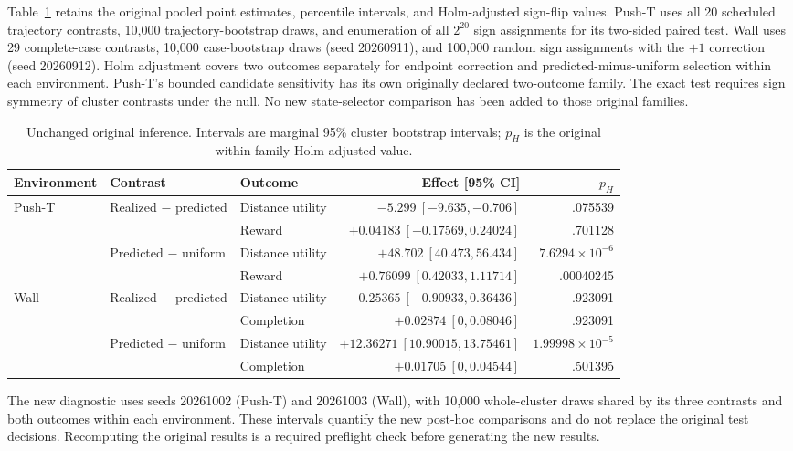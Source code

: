 Table~\ref{tab:original} retains the original pooled point estimates, percentile
intervals, and Holm-adjusted sign-flip values. Push-T uses all 20 scheduled
trajectory contrasts, 10,000 trajectory-bootstrap draws, and enumeration of
all $2^{20}$ sign assignments for its two-sided paired test. Wall uses 29
complete-case contrasts, 10,000 case-bootstrap draws (seed 20260911), and
100,000 random sign assignments with the $+1$ correction (seed 20260912).
Holm adjustment covers two outcomes separately for endpoint correction and
predicted-minus-uniform selection within each environment. Push-T's bounded
candidate sensitivity has its own originally declared two-outcome family.
The exact test requires sign symmetry of cluster contrasts under the null.
No new state-selector comparison has been added to those original families.

\begin{table}[h]
\caption{Unchanged original inference. Intervals are marginal 95\% cluster
bootstrap intervals; $p_H$ is the original within-family Holm-adjusted value.}
\label{tab:original}
\centering\small
\begingroup
\setlength{\tabcolsep}{3pt}
\begin{tabular}{lllrr}
\toprule
Environment & Contrast & Outcome & Effect [95\% CI] & $p_H$\\
\midrule
Push-T & Realized $-$ predicted & Distance utility & $-5.299\ [-9.635,-0.706]$ & .075539\\
 & & Reward & $+0.04183\ [-0.17569,0.24024]$ & .701128\\
 & Predicted $-$ uniform & Distance utility & $+48.702\ [40.473,56.434]$ & $7.6294\!\times\!10^{-6}$\\
 & & Reward & $+0.76099\ [0.42033,1.11714]$ & .00040245\\
Wall & Realized $-$ predicted & Distance utility & $-0.25365\ [-0.90933,0.36436]$ & .923091\\
 & & Completion & $+0.02874\ [0,0.08046]$ & .923091\\
 & Predicted $-$ uniform & Distance utility & $+12.36271\ [10.90015,13.75461]$ & $1.99998\!\times\!10^{-5}$\\
 & & Completion & $+0.01705\ [0,0.04544]$ & .501395\\
\bottomrule
\end{tabular}
\endgroup
\end{table}

The new diagnostic uses seeds 20261002 (Push-T) and 20261003 (Wall), with
10,000 whole-cluster draws shared by its three contrasts and both outcomes
within each environment. These intervals quantify the new post-hoc comparisons
and do not replace the original test decisions. Recomputing the original
results is a required preflight check before generating the new results.

